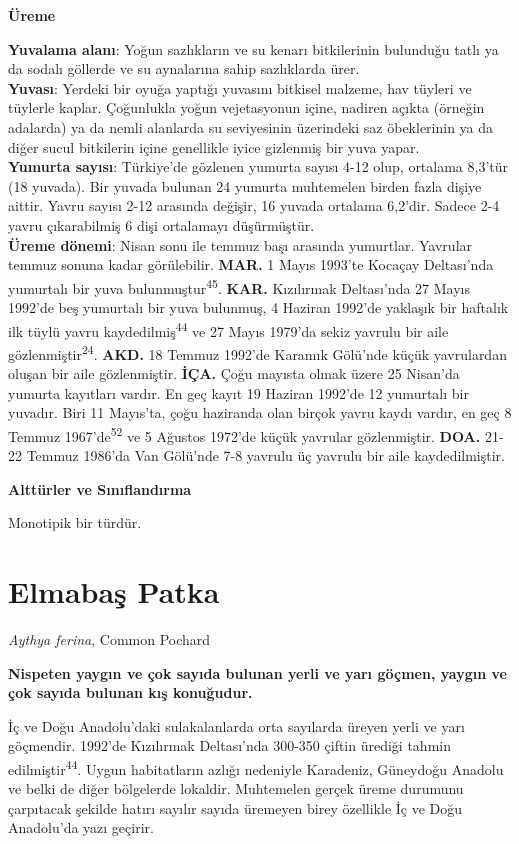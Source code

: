 \documentclass[
  letterpaper,
  DIV=11,
  numbers=noendperiod]{scrreprt}
\begin{document}
\textbf{Üreme}

\textbf{Yuvalama alanı}: Yoğun sazlıkların ve su kenarı bitkilerinin
bulunduğu tatlı ya da sodalı göllerde ve su aynalarına sahip sazlıklarda
ürer.\\
\textbf{Yuvası}: Yerdeki bir oyuğa yaptığı yuvasını bitkisel malzeme,
hav tüyleri ve tüylerle kaplar. Çoğunlukla yoğun vejetasyonun içine,
nadiren açıkta (örneğin adalarda) ya da nemli alanlarda su seviyesinin
üzerindeki saz öbeklerinin ya da diğer sucul bitkilerin içine genellikle
iyice gizlenmiş bir yuva yapar.\\
\textbf{Yumurta sayısı}: Türkiye'de gözlenen yumurta sayısı 4-12 olup,
ortalama 8,3'tür (18 yuvada). Bir yuvada bulunan 24 yumurta muhtemelen
birden fazla dişiye aittir. Yavru sayısı 2-12 arasında değişir, 16
yuvada ortalama 6,2'dir. Sadece 2-4 yavru çıkarabilmiş 6 dişi ortalamayı
düşürmüştür.\\
\textbf{Üreme dönemi}: Nisan sonu ile temmuz başı arasında yumurtlar.
Yavrular temmuz sonuna kadar görülebilir. \textbf{MAR.} 1 Mayıs 1993'te
Kocaçay Deltası'nda yumurtalı bir yuva bulunmuştur\textsuperscript{45}.
\textbf{KAR.} Kızılırmak Deltası'nda 27 Mayıs 1992'de beş yumurtalı bir
yuva bulunmuş, 4 Haziran 1992'de yaklaşık bir haftalık ilk tüylü yavru
kaydedilmiş\textsuperscript{44} ve 27 Mayıs 1979'da sekiz yavrulu bir
aile gözlenmiştir\textsuperscript{24}. \textbf{AKD.} 18 Temmuz 1992'de
Karamık Gölü'nde küçük yavrulardan oluşan bir aile gözlenmiştir.
\textbf{İÇA.} Çoğu mayısta olmak üzere 25 Nisan'da yumurta kayıtları
vardır. En geç kayıt 19 Haziran 1992'de 12 yumurtalı bir yuvadır. Biri
11 Mayıs'ta, çoğu haziranda olan birçok yavru kaydı vardır, en geç 8
Temmuz 1967'de\textsuperscript{52} ve 5 Ağustos 1972'de küçük yavrular
gözlenmiştir. \textbf{DOA.} 21-22 Temmuz 1986'da Van Gölü'nde 7-8
yavrulu üç yavrulu bir aile kaydedilmiştir.

\textbf{Alttürler ve Sınıflandırma}

Monotipik bir türdür.

\section{Elmabaş Patka}\label{elmabaux15f-patka}

\emph{Aythya ferina}, Common Pochard

\textbf{Nispeten yaygın ve çok sayıda bulunan yerli ve yarı göçmen,
yaygın ve çok sayıda bulunan kış konuğudur.}

İç ve Doğu Anadolu'daki sulakalanlarda orta sayılarda üreyen yerli ve
yarı göçmendir. 1992'de Kızılırmak Deltası'nda 300-350 çiftin ürediği
tahmin edilmiştir\textsuperscript{44}. Uygun habitatların azlığı
nedeniyle Karadeniz, Güneydoğu Anadolu ve belki de diğer bölgelerde
lokaldir. Muhtemelen gerçek üreme durumunu çarpıtacak şekilde hatırı
sayılır sayıda üremeyen birey özellikle İç ve Doğu Anadolu'da yazı
geçirir.
\end{document}
